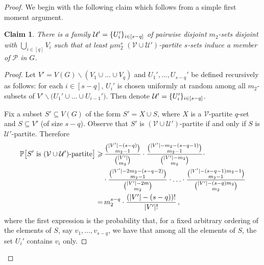 \documentclass[12pt,reqno]{amsart}
\theoremstyle{plain}
\newtheorem{claim}[theorem]{Claim}
\theoremstyle{definition}
\numberwithin{equation}{section}
\DeclarePairedDelimiter{\abs}{\lvert}{\rvert}
\DeclarePairedDelimiter{\set}{\{}{\}}
\renewcommand{\ge}{\geqslant}
\renewcommand{\setminus}{\smallsetminus}
\newcommand{\cP}{\mathcal{P}}
\newcommand{\cU}{\mathcal{U}}
\newcommand{\cV}{\mathcal{V}}
\begin{document}
	\begin{proof}
		We begin with the following claim which follows from a simple first moment argument.
		\begin{claim}
			There is a family $\cU' = \set{U_i'}_{i \in [s - q]}$ of pairwise disjoint $m_2$-sets disjoint with $\bigcup_{i\in[q]} V_i$ such that at least $\mu m_2^s$ $(\cV \cup \cU')$-partite $s$-sets induce a member of $\cP$ in $G$.
		\end{claim}
		\begin{proof}
			Let $V'=V(G) \setminus (V_1 \cup \dots \cup V_q)$ and $U_1', \dots, U_{s - q}'$ be defined recursively as follows: for each $i \in [s - q]$, $U_i'$ is chosen uniformly at random among all $m_2$-subsets of $V' \setminus \big(U_1' \cup \dots \cup U_{i-1}'\big)$.
			Then denote $\cU' = \set{U_i'}_{i \in [s - q]}$.
			
			Fix a subset  $S'\subseteq V(G)$ of the form $S'=X \cup S$, where $X$ is a $\cV$-partite $q$-set and $S \subseteq V'$ (of size $s - q$).
			Observe that $S'$ is $(\cV \cup \cU')$-partite if and only if $S$ is $\cU'$-partite.
			Therefore
			\begin{align*}
				\mathbb{P}\big[S' \text{ is } (\cV \cup \cU')\text{-partite}\big] \ge & \, \frac{\binom{\abs{V'}-(s - q)}{m_2-1}}{\binom{\abs{V'}}{m_2}} \cdot
				\frac{\binom{\abs{V'}-m_2-(s - q-1)}{m_2-1}}{\binom{\abs{V'}-m_2}{m_2}} \cdot                                                                  \\
				& \cdot
				\frac{\binom{\abs{V'}-2m_2-(s - q-2)}{m_2-1}}{\binom{\abs{V'}-2m}{m_2}} \cdot
				\dotsc
				\cdot
				\frac{\binom{\abs{V'}-(s - q-1)m_2-1}{m_2-1}}{\binom{\abs{V'}-(s - q)m_2}{m_2}}                                                                \\
				=                                                                     & \, m_2^{s - q} \cdot \frac{(\abs{V'}-(s - q))!}{\abs{V'}!}\, ,
			\end{align*}
			where the first expression is the probability that, for a fixed arbitrary ordering of the elements of $S$, say $v_1, \dots, v_{s - q}$, we have that among all the elements of $S$, the set $U_i'$ contains $v_i$ only.
			

\end{proof}
\end{proof}
\end{document}
